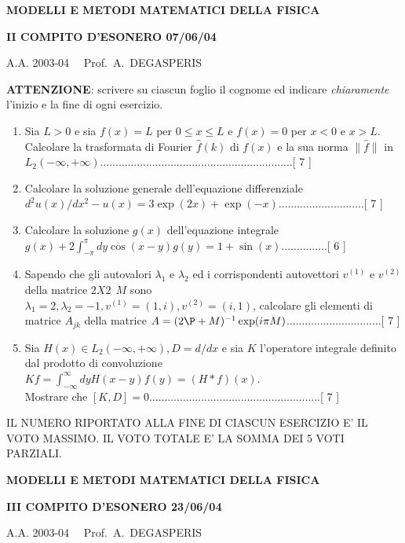 \documentclass[a4paper,10pt]{article}
\begin{document}
\centerline{\bf MODELLI E METODI MATEMATICI DELLA FISICA}
\centerline{\bf II COMPITO D'ESONERO   07/06/04}
\centerline{A.A. 2003-04 \ \ Prof.\ A.\ DEGASPERIS}
\vspace{20pt}
\noindent
{\bf ATTENZIONE}:
\noindent
scrivere su ciascun foglio il cognome ed indicare 
\emph{chiaramente} l'inizio e la fine di ogni esercizio.
\vspace{20pt}
\noindent
\begin{enumerate}
\item Sia $L>0$ e sia $f(x)=L$ per $0\leq x\leq L$ e $f(x)=0$ per $x<0$ e 
$x>L$. Calcolare la trasformata di Fourier $\hat{f}(k)$ di
$f(x)$ e la sua norma $\parallel \hat{f} \parallel$ in
$L_2(-\infty,+\infty )$...............................................................[ 7 ] 
\item Calcolare la soluzione generale dell'equazione differenziale\\
$d^2u(x)/dx^2-u(x)=3\exp(2x) +\exp(-x)$............................[ 7 ]
\item Calcolare la soluzione $g(x)$ dell'equazione integrale\\
$g(x)+2\int_{-\pi}^{\pi}dy\cos(x-y)g(y)=1+\sin(x)$...............[ 6 ]  
\item Sapendo che gli autovalori $\lambda_1$ e $\lambda_2$ ed i
corrispondenti autovettori $v^{(1)}$ e $v^{(2)}$ della matrice $2X2~~M$
 sono\\ $\lambda_1=2 , \lambda_2= -1 , v^{(1)}=(1,i) , v^{(2)}=(i,1)$, 
calcolare gli elementi di matrice $A_{jk}$ della
 matrice $A=(2\P + M)^{-1} \exp(i\pi M)$...............................[ 7 ]
\item Sia $H(x)\in L_2(-\infty,+\infty) , D=d/dx$
e sia $K$ l'operatore integrale definito dal prodotto di convoluzione\\
 $Kf=\int_{-\infty}^{\infty}dyH(x-y)f(y)=(H\ast f)(x)$.\\
Mostrare che $[K , D]=0$........................................................[ 7 ]
\end{enumerate}
\noindent IL NUMERO RIPORTATO ALLA FINE DI CIASCUN ESERCIZIO
E' IL VOTO MASSIMO. IL VOTO TOTALE E' LA SOMMA DEI 5 VOTI PARZIALI.



\newpage

\centerline{\bf MODELLI E METODI MATEMATICI DELLA FISICA}

\centerline{\bf III COMPITO D'ESONERO   23/06/04}

\centerline{A.A. 2003-04 \ \ Prof.\ A.\ DEGASPERIS}
\end{document}
